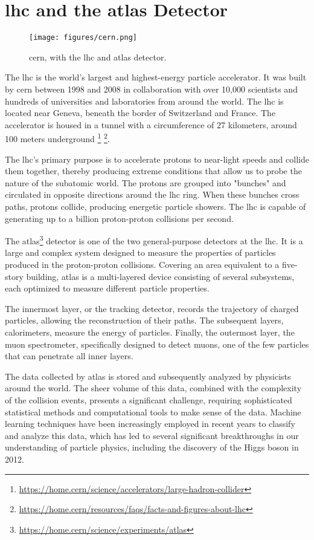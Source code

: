 \section[LHC and the ATLAS Detector]{\gls{lhc} and the \gls{atlas} Detector}

\begin{figure}[h]
    \centering
    \texttt{[image: figures/cern.png]}
    \caption{\gls{cern}, with the \gls{lhc} and \gls{atlas} detector.}
    \label{fig:cern}
\end{figure}

The \gls{lhc} is the world's largest and highest-energy particle accelerator. It was built by
\gls{cern} between 1998 and 2008 in collaboration with over 10,000 scientists and
hundreds of universities and laboratories from around the world. The \gls{lhc} is located near Geneva, beneath the border of
Switzerland and France. The accelerator is housed in a tunnel with a circumference of 27 kilometers, around 100
meters underground
\footnote{\url{https://home.cern/science/accelerators/large-hadron-collider}}
\footnote{\url{https://home.cern/resources/faqs/facts-and-figures-about-lhc}}.

The \gls{lhc}'s primary purpose is to accelerate protons to near-light speeds and collide them together, thereby producing
extreme conditions that allow us to probe the nature of the subatomic world. The protons are grouped into "bunches" and
circulated in opposite directions around the \gls{lhc} ring. When these bunches cross paths, protons collide, producing
energetic particle showers. The \gls{lhc} is capable of generating up to a billion proton-proton collisions per second.

The \gls{atlas}\footnote{\url{https://home.cern/science/experiments/atlas}} detector is one of the two general-purpose
detectors at the \gls{lhc}. It is a large and complex system designed to measure the properties of particles produced in
the proton-proton collisions. Covering an area equivalent to a five-story building, \gls{atlas} is a multi-layered
device consisting of several subsystems, each optimized to measure different particle properties.

The innermost layer, or the tracking detector, records the trajectory of charged particles, allowing the reconstruction
of their paths. The subsequent layers, calorimeters, measure the energy of particles. Finally, the outermost layer, the
muon spectrometer, specifically designed to detect muons, one of the few particles that can penetrate all inner layers.

The data collected by \gls{atlas} is stored and subsequently analyzed by physicists around the world. The sheer volume of this
data, combined with the complexity of the collision events, presents a significant challenge, requiring sophisticated
statistical methods and computational tools to make sense of the data. Machine learning techniques have been
increasingly employed in recent years to classify and analyze this data, which has led to several significant
breakthroughs in our understanding of particle physics, including the discovery of the Higgs boson in 2012.

